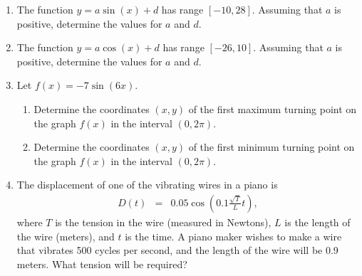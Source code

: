 \begin{enumerate}
\begin{enumerate}
\begin{tikzpicture}[y=.6cm, x=1.3cm,font=\sffamily]
  \end{tikzpicture}

\end{enumerate}


\clearpage

\item The function $y=a\sin(x)+d$ has range $[-10,28]$.  Assuming that $a$ is positive, determine the values for $a$ and $d$.

\vfill
\item The function $y=a\cos(x)+d$ has range $[-26,10]$.  Assuming that $a$ is positive, determine the values for $a$ and $d$.
\vfill

\item Let $f(x)=-7\sin(6x)$.
\begin{enumerate}
\item Determine the coordinates $(x,y)$ of the first maximum turning point on the graph $f(x)$ in the interval $(0,2\pi)$.
\vfill

\item Determine the coordinates $(x,y)$ of the first minimum turning point on the graph $f(x)$ in the interval $(0,2\pi)$.
\vfill

\end{enumerate}

\clearpage

\item The displacement of one of the vibrating wires in a piano is
  \begin{eqnarray*}
    D(t) & = & 0.05\cos\left(0.1\frac{\sqrt{T}}{L} t \right),
  \end{eqnarray*}
  where $T$ is the tension in the wire (measured in Newtons), $L$ is
  the length of the wire (meters), and $t$ is the time. A piano maker
  wishes to make a wire that vibrates 500 cycles per second, and the
  length of the wire will be 0.9 meters. What tension will be
  required?



\end{enumerate}



